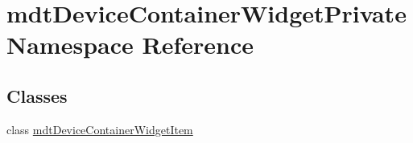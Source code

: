 \hypertarget{namespacemdt_device_container_widget_private}{\section{mdt\-Device\-Container\-Widget\-Private Namespace Reference}
\label{namespacemdt_device_container_widget_private}
}
\subsection*{Classes}
\begin{DoxyCompactItemize}
\item 
class \hyperlink{classmdt_device_container_widget_private_1_1mdt_device_container_widget_item}{mdt\-Device\-Container\-Widget\-Item}
\end{DoxyCompactItemize}
